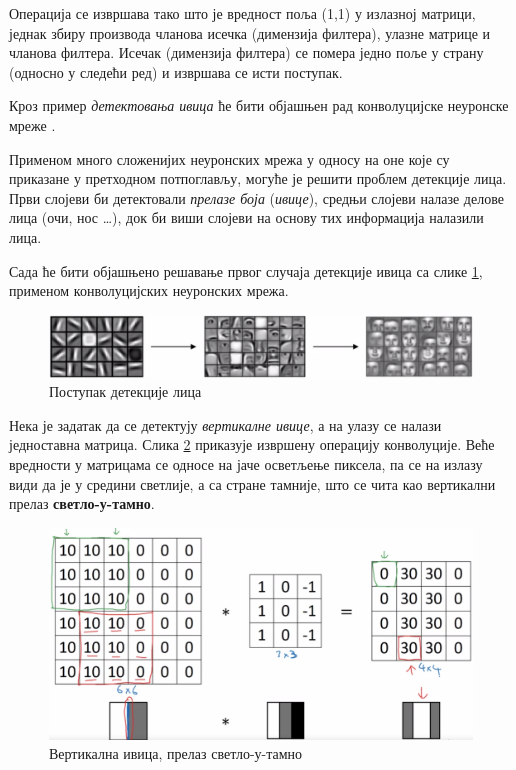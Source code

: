 \documentclass[12pt, а4paper]{article}
\begin{document}
Операција се извршава тако што је вредност поља (1,1) у излазној матрици,
једнак збиру производа
чланова исечка (димензија филтера), улазне матрице и чланова филтера. Исечак
(димензија филтера) се помера једно поље у страну (односно у следећи ред) и
извршава се исти поступак.

Кроз пример \textit{детектовања ивица} ће бити објашњен рад конволуцијске
неуронске мреже \cite{ngEdgeDet}.

Применом много сложенијих неуронских мрежа у односу на оне које су приказане
у претходном потпоглављу, могуће је решити проблем детекције лица. Први
слојеви би детектовали \textit{прелазе боја} (\textit{ивице}), средњи
слојеви налазе делове лица (очи, нос \dots), док би виши слојеви
на основу тих информација налазили лица.

Сада ће бити објашњено решавање првог случаја детекције ивица
са слике \ref{fig:ng_Edge1}, применом конволуцијских неуронских мрежа.

\begin{figure}[H]
  \centering
      \includegraphics[scale=0.4]{slike/ngEdge1.png}
  \caption{Поступак детекције лица}
  \label{fig:ng_Edge1}
\end{figure}

Нека је задатак да се детектују \textit{вертикалне ивице}, а на улазу се
налази једноставна матрица.
Слика \ref{fig:ng_KonvoucijaVert} приказује
извршену операцију конволуције. Веће вредности у матрицама се односе
на јаче осветљење пиксела, па се на излазу види да је у средини 
светлије, а са стране тамније, што се чита као
вертикални прелаз \textbf{светло-у-тамно}.

\begin{figure}[H]
  \centering
      \includegraphics[scale=0.35]{slike/ngKonvoucijaVert.png}
  \caption{Вертикална ивица, прелаз светло-у-тамно}
  \label{fig:ng_KonvoucijaVert}
\end{figure}
\end{document}
